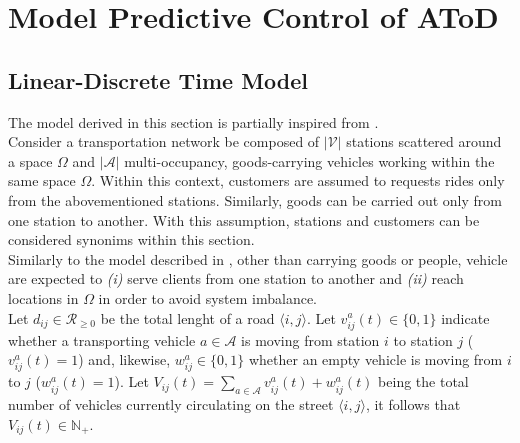 \chapter{Model Predictive Control of AToD}\label{ch:mpc}
\section{Linear-Discrete Time Model}\label{sec:linear_discrete_time_model}
The model derived in this section is partially inspired from \cite{zhang2016}. \\
Consider a transportation network be composed of $|\mathcal{V}|$ stations scattered around a space $\Omega$ and $|\mathcal{A}|$ multi-occupancy, goods-carrying vehicles working within the same space $\Omega$. Within this context, customers are assumed to requests rides only from the abovementioned stations. Similarly, goods can be carried out only from one station to another. With this assumption, stations and customers can be considered synonims within this section. \\
Similarly to the model described in , other than carrying goods or people, vehicle are expected to \textit{(i)} serve clients from one station to another and \textit{(ii)} reach locations in $\Omega$ in order to avoid system imbalance. \\
Let $d_{ij} \in \mathcal{R}_{\ge0}$ be the total lenght of a road \(\langle i,j\rangle\). Let $v^a_{ij}(t) \in \{0,1\}$ indicate whether a transporting vehicle $a \in \mathcal{A}$ is moving from station $i$ to station $j$ ($v^a_{ij}(t) = 1$) and, likewise, $w^{a}_{ij}\in \{0,1\} $ whether an empty vehicle is moving from $i$ to $j$ ($w^{a}_{ij}(t)= 1$). Let $V_{ij}(t) = \sum_{a \in \mathcal{A}} v^{a}_{ij}(t) +w^{a}_{ij}(t)$ being the total number of vehicles currently circulating on the street $\langle i,j\rangle$, it follows that $V_{ij}(t) \in \mathbb{N}_+$. \\
